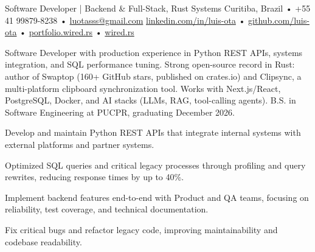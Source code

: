 




\cvheader
  {Software Developer | Backend \& Full-Stack, Rust Systems}
  {Curitiba, Brazil • +55 41 99879-8238 • \href{mailto:luotasss@gmail.com}{luotasss@gmail.com}}
  {\href{https://linkedin.com/in/luis-ota}{linkedin.com/in/luis-ota} • \href{https://github.com/luis-ota}{github.com/luis-ota} • \href{https://portfolio.wired.rs}{portfolio.wired.rs} • \href{https://wired.rs}{wired.rs}}

Software Developer with production experience in Python REST APIs, systems integration, and SQL performance tuning. Strong open-source record in Rust: author of Swaptop (160+ GitHub stars, published on crates.io) and Clipsync, a multi-platform clipboard synchronization tool. Works with Next.js/React, PostgreSQL, Docker, and AI stacks (LLMs, RAG, tool-calling agents). B.S. in Software Engineering at PUCPR, graduating December 2026.



\begin{cvbullets}
  \item Develop and maintain Python REST APIs that integrate internal systems with external platforms and partner systems.
  \item Optimized SQL queries and critical legacy processes through profiling and query rewrites, reducing response times by up to 40\%.
  \item Implement backend features end-to-end with Product and QA teams, focusing on reliability, test coverage, and technical documentation.
  \item Fix critical bugs and refactor legacy code, improving maintainability and codebase readability.
\end{cvbullets}

